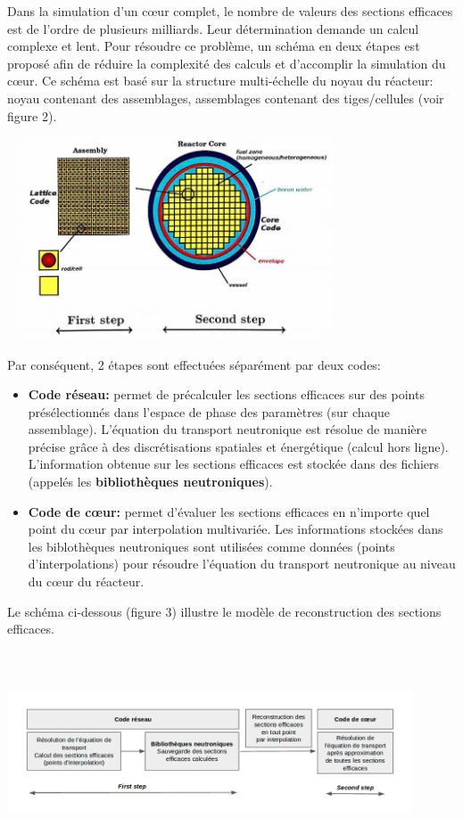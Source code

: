 Dans la simulation d'un cœur complet, le nombre de valeurs des sections efficaces est de l'ordre
de plusieurs milliards. Leur détermination demande un calcul complexe et lent.
Pour résoudre ce problème, un schéma en deux étapes est proposé afin de réduire la complexité
des calculs et d'accomplir la simulation du cœur. Ce schéma est basé sur la structure multi-échelle
du noyau du réacteur: noyau contenant des assemblages, assemblages contenant des tiges/cellules (voir figure 2).
\begin{center}
\includegraphics[height=6cm,width=10cm]{images/figure2.jpg}
\end{center}

\newpage
Par conséquent, 2 étapes sont effectuées séparément par deux codes:
\begin{itemize}
		\item \textbf{Code réseau:} permet de précalculer les sections efficaces sur des points
		présélectionnés dans l'espace de phase des paramètres (sur chaque assemblage). L'équation du transport neutronique est
		résolue de manière précise grâce à des discrétisations spatiales et énergétique (calcul hors ligne).
		L'information obtenue sur les sections efficaces est stockée dans des fichiers (appelés les \textbf{bibliothèques neutroniques}).
		\item \textbf{Code de cœur:} permet d'évaluer les sections efficaces en n'importe quel point du cœur par interpolation multivariée.
		Les informations stockées dans les biblothèques neutroniques sont utilisées comme données (points d'interpolations)
		pour résoudre l'équation du transport neutronique au niveau du cœur du réacteur.
\end{itemize}
Le schéma ci-dessous (figure 3) illustre le modèle de reconstruction des sections efficaces.
\begin{center}
\includegraphics[height=6cm,width=12cm]{images/figure1.png}
\end{center}

